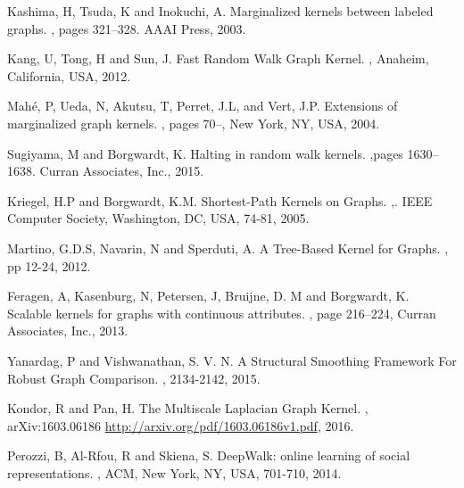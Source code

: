 \begin{thebibliography}{99}
 Kashima, H,  Tsuda, K and Inokuchi, A. 
\newblock Marginalized kernels between labeled graphs. 
, pages 321–328. AAAI Press, 2003.

 Kang, U, Tong, H and Sun, J.
\newblock Fast Random Walk Graph Kernel.
, Anaheim, California, USA, 2012.

 Mah{\' e}, P,  Ueda, N, Akutsu, T, Perret, J.L, and  Vert, J.P. \newblock Extensions of marginalized graph kernels. 
, pages 70–, New York, NY, USA, 2004.

 Sugiyama, M and Borgwardt, K. 
\newblock Halting in random walk kernels.
,pages 1630–1638. Curran Associates, Inc., 2015.


  Kriegel, H.P and Borgwardt, K.M.
\newblock  Shortest-Path Kernels on Graphs. 
,. IEEE Computer Society, Washington, DC, USA, 74-81, 2005.

  Martino, G.D.S,  Navarin, N and  Sperduti, A.
\newblock A Tree-Based Kernel for Graphs.
, pp 12-24, 2012.

 Feragen, A, Kasenburg, N, Petersen, J, Bruijne, D. M and Borgwardt, K.
\newblock Scalable kernels for graphs with continuous attributes.
, page 216--224, Curran Associates, Inc., 2013.

 Yanardag, P and Vishwanathan, S. V. N. 
\newblock A Structural Smoothing Framework For Robust Graph Comparison. , 2134-2142, 2015.

 Kondor, R and Pan, H.
\newblock The Multiscale Laplacian Graph Kernel.
, arXiv:1603.06186 
\newblock \url {http://arxiv.org/pdf/1603.06186v1.pdf}, 2016.

 Perozzi, B,  Al-Rfou, R and Skiena, S.
\newblock DeepWalk: online learning of social representations. 
, ACM, New York, NY, USA, 701-710, 2014.


\end{thebibliography}
